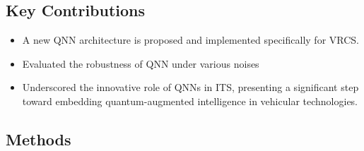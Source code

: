 \documentclass[12pt,a4paper]{article}
\begin{document}
\subsection*{Key Contributions}
\begin{itemize}
    \item A new QNN architecture is proposed and implemented specifically for VRCS.
    \item Evaluated the robustness of QNN under various noises
    \item Underscored the innovative role of QNNs in ITS, presenting a significant step toward embedding quantum-augmented intelligence in vehicular technologies.
\end{itemize}

\subsection*{Methods}
\end{document}
